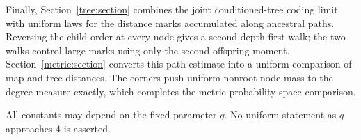 \documentclass[11pt,a4paper]{article}
\numberwithin{equation}{section}
\theoremstyle{definition}
\theoremstyle{remark}
\newcommand{\1}{\mathbf 1}
\begin{document}
Finally, Section~\ref{tree:section} combines the joint conditioned-tree
coding limit with uniform laws for the distance marks accumulated along
ancestral paths. Reversing the child order at every node gives a second
depth-first walk; the two walks control large marks using only the
second offspring moment. Section~\ref{metric:section} converts this path
estimate into a uniform comparison of map and tree distances. The
corners push uniform nonroot-node mass to the degree measure exactly,
which completes the metric probability-space comparison.

All constants may depend on the fixed parameter $q$. No uniform
statement as $q$ approaches $4$ is asserted.







\end{document}
